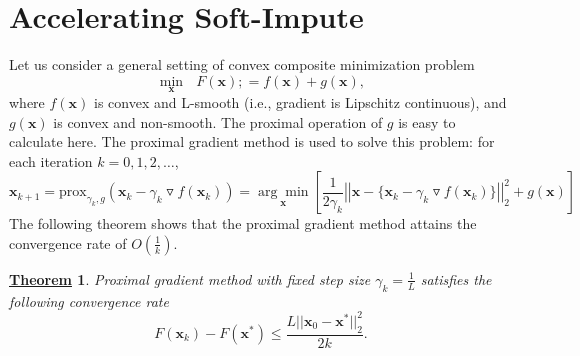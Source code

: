 \documentclass[12pt]{article}
\newcommand{\smc}{\twelvesmc}
\newtheorem{thm}{\underline{\smc Theorem}}
\begin{document}
\section{Accelerating \textbf{Soft-Impute}}
Let us consider a general setting of convex composite minimization problem
\begin{equation*}
\underset{\bm{x}}{\min}\text{ }F(\bm{x}) ;= f(\bm{x}) + g(\bm{x}),
\end{equation*}
where $f(\bm{x})$ is convex and L-smooth (i.e., gradient is Lipschitz continuous), and  $g(\bm{x})$ is convex and non-smooth. The proximal operation of $g$ is easy to calculate here.  The proximal gradient method \cite{bruck1975iterative} is used to solve this problem: for each iteration $k = 0,1,2,\ldots$,
\begin{equation*}
\bm{x}_{k+1} = \text{prox}_{\gamma_{k}, g}(\bm{x}_{k}-\gamma_{k}\triangledown f(\bm{x}_{k})) = 
\underset{\bm{x}}{\arg\min}\left[\frac{1}{2\gamma_{k}}\left|\left|\bm{x} - \{\bm{x}_{k}-\gamma_{k}\triangledown f(\bm{x}_{k})\}\right|\right|^{2}_{2}+g(\bm{x})\right]
\end{equation*}
The following theorem shows that the proximal gradient method attains the convergence rate of $O\left(\frac{1}{k}\right)$.

\begin{thm}
	Proximal gradient method with fixed step size $\gamma_{k} = \frac{1}{L}$ satisfies the following convergence rate
	\begin{equation*}
	F(\bm{x}_{k}) - F(\bm{x}^{*}) \leq \frac{L||\bm{x}_{0}-\bm{x}^{*}||^{2}_{2}}{2k}.
	\end{equation*}
\end{thm}
\end{document}
